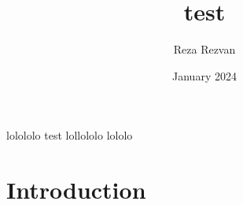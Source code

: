 \documentclass{article}
\title{test}
\author{Reza Rezvan}
\date{January 2024}
\begin{document}
\maketitle

lolololo test lollololo lololo

\section{Introduction}
\end{document}
